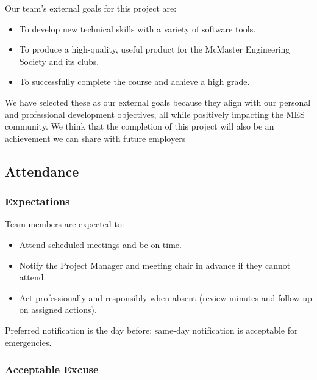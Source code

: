 \documentclass{article}
\begin{document}

Our team's external goals for this project are:
\begin{itemize}
  \item To develop new technical skills with a variety of software tools.
  \item To produce a high-quality, useful product for the McMaster Engineering Society and its clubs.
  \item To successfully complete the course and achieve a high grade.
\end{itemize}

We have selected these as our external goals because they align with our personal and professional development objectives, all while positively impacting the MES community. We think that the completion of this project will also be an achievement we can share with future employers


\subsection*{Attendance}

\subsubsection*{Expectations}

Team members are expected to: 
\begin{itemize}
  \item Attend scheduled meetings and be on time.
  \item Notify the Project Manager and meeting chair in advance if they cannot attend.
  \item Act professionally and responsibly when absent (review minutes and follow up on assigned actions).
\end{itemize}

Preferred notification is the day before; same-day notification is acceptable for emergencies.

\subsubsection*{Acceptable Excuse}
\end{document}

